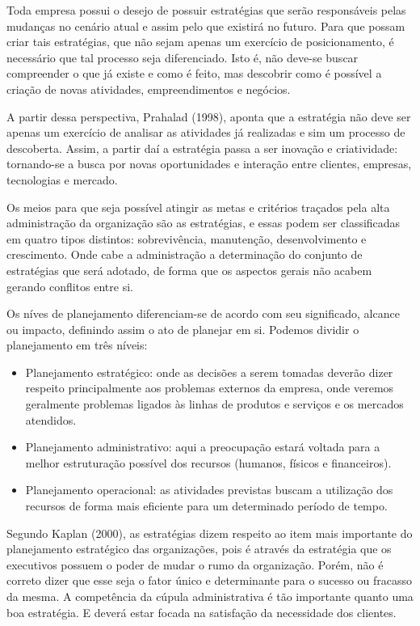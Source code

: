 \documentclass[12pt,a4paper,ruledheader,tocpage=prefix,floatnumber=continuous,pagestart=folhaderosto,font=times]{abnt}
\begin{document}
Toda empresa possui o desejo de possuir estratégias que serão responsáveis pelas mudanças no cenário atual e assim pelo que existirá no futuro. Para que possam
criar tais estratégias, que não sejam apenas um exercício de posicionamento, é necessário que tal processo seja diferenciado. Isto é, não deve-se buscar 
compreender o que já existe e como é feito, mas descobrir como é possível a criação de novas atividades, empreendimentos e negócios. 

A partir dessa perspectiva, Prahalad (1998), aponta que a estratégia não deve ser apenas um exercício de analisar as atividades já realizadas e sim um processo
de descoberta. Assim, a partir daí a estratégia passa a ser inovação e criatividade: tornando-se a busca por novas oportunidades e interação entre clientes, 
empresas, tecnologias e mercado.

Os meios para que seja possível atingir as metas e critérios traçados pela alta administração da organização são as estratégias, e essas
podem ser classificadas em quatro tipos distintos: sobrevivência, manutenção, desenvolvimento e crescimento. Onde cabe a administração a determinação do conjunto
de estratégias que será adotado, de forma que os aspectos gerais não acabem gerando conflitos entre si.

Os níves de planejamento diferenciam-se de acordo com seu significado, alcance ou impacto, definindo assim o ato de planejar em si. Podemos dividir o 
planejamento em três níveis\cite{sanvicente}:

\begin{itemize}
 \item Planejamento estratégico: onde as decisões a serem tomadas deverão dizer respeito principalmente aos problemas externos da empresa, onde veremos geralmente
       problemas ligados às linhas de produtos e serviços e os mercados atendidos.
 \item Planejamento administrativo: aqui a preocupação estará voltada para a melhor estruturação possível dos recursos (humanos, físicos e financeiros).
 \item Planejamento operacional: as atividades previstas buscam a utilização dos recursos de forma mais eficiente para um determinado período de tempo.
\end{itemize}

Segundo Kaplan (2000), as estratégias dizem respeito ao item mais importante do planejamento estratégico das organizações, pois é através da estratégia
que os executivos possuem o poder de mudar o rumo da organização. Porém, não é correto dizer que esse seja o fator único e determinante para o sucesso ou
fracasso da mesma. A competência da cúpula administrativa é tão importante quanto uma boa estratégia. E deverá estar focada na satisfação da necessidade
dos clientes.
\end{document}
